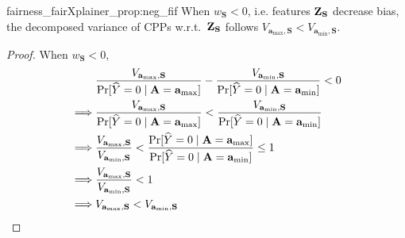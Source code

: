 \begin{repproposition}{fairness_fairXplainer_prop:neg_fif}
	When $ w_{\mathbf{S}} < 0 $, i.e. features $ \mathbf{Z}_{\mathbf{S}} $ decrease bias, the decomposed variance of CPPs w.r.t.\ $ \mathbf{Z}_{\mathbf{S}} $ follows $ V_{\mathbf{a}_{\max}, \mathbf{S}} < V_{\mathbf{a}_{\min}, \mathbf{S}}  $.
\end{repproposition}

\begin{proof}
	When $ w_{\mathbf{S}} < 0 $,
	\begin{align*}
	&\frac{V_{\mathbf{a}_{\max}, \mathbf{S}}}{ \Pr[\widehat{Y} = 0 \mid  \mathbf{A} = \mathbf{a}_{\max}]} - \frac{V_{\mathbf{a}_{\min}, \mathbf{S}} }{\Pr[\widehat{Y} = 0 \mid  \mathbf{A} = \mathbf{a}_{\min}]} < 0 \\
	\implies&\frac{V_{\mathbf{a}_{\max}, \mathbf{S}}}{ \Pr[\widehat{Y} = 0 \mid  \mathbf{A} = \mathbf{a}_{\max}]} < \frac{V_{\mathbf{a}_{\min}, \mathbf{S}} }{\Pr[\widehat{Y} = 0 \mid  \mathbf{A} = \mathbf{a}_{\min}]} \\
	\implies&\frac{V_{\mathbf{a}_{\max}, \mathbf{S}}}{V_{\mathbf{a}_{\min}, \mathbf{S}}} < \frac{\Pr[\widehat{Y} = 0 \mid  \mathbf{A} = \mathbf{a}_{\max}]}{\Pr[\widehat{Y} = 0 \mid  \mathbf{A} = \mathbf{a}_{\min}]} \le 1 \\
	\implies&\frac{V_{\mathbf{a}_{\max}, \mathbf{S}}}{V_{\mathbf{a}_{\min}, \mathbf{S}}} < 1 \\ 
	\implies&V_{\mathbf{a}_{\max}, \mathbf{S}} < V_{\mathbf{a}_{\min}, \mathbf{S}}
	\end{align*}
\end{proof}

